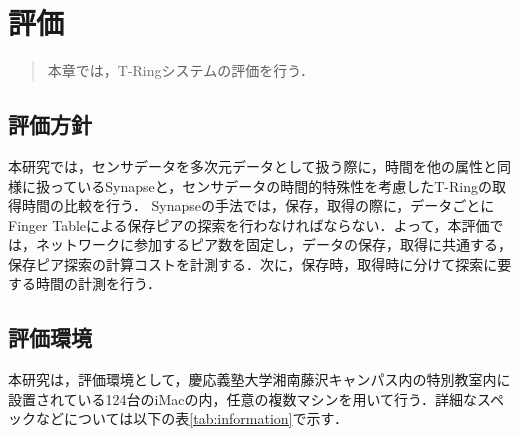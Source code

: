 \chapter{評価}
\begin{large}
\begin{quote}
本章では，T-Ringシステムの評価を行う．
\end{quote}
\end{large}
\clearpage

\section{評価方針}
本研究では，センサデータを多次元データとして扱う際に，時間を他の属性と同様に扱っているSynapseと，センサデータの時間的特殊性を考慮したT-Ringの取得時間の比較を行う．
Synapseの手法では，保存，取得の際に，データごとにFinger Tableによる保存ピアの探索を行わなければならない．よって，本評価では，ネットワークに参加するピア数を固定し，データの保存，取得に共通する，保存ピア探索の計算コストを計測する．次に，保存時，取得時に分けて探索に要する時間の計測を行う．

\section{評価環境}
本研究は，評価環境として，慶応義塾大学湘南藤沢キャンパス内の特別教室内に設置されている124台のiMacの内，任意の複数マシンを用いて行う．詳細なスペックなどについては以下の表\ref{tab:information}で示す．

